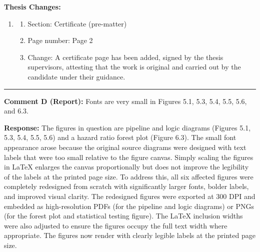 \documentclass[12pt,a4paper]{article}
\begin{document}
\begin{flushleft}
\textbf{Thesis Changes:}
\begin{enumerate}
    \item
    \begin{enumerate}
        \item Section: Certificate (pre-matter)
        \item Page number: Page 2
        \item Change: A certificate page has been added, signed by the thesis supervisors, attesting that the work is original and carried out by the candidate under their guidance.
    \end{enumerate}
\end{enumerate}

\vspace{\baselineskip}

\hrule

\vspace{\baselineskip}

\textbf{Comment D (Report):} Fonts are very small in Figures 5.1, 5.3, 5.4, 5.5, 5.6, and 6.3.

\vspace{\baselineskip}

\textbf{Response:} The figures in question are pipeline and logic diagrams (Figures 5.1, 5.3, 5.4, 5.5, 5.6) and a hazard ratio forest plot (Figure 6.3). The small font appearance arose because the original source diagrams were designed with text labels that were too small relative to the figure canvas. Simply scaling the figures in LaTeX enlarges the canvas proportionally but does not improve the legibility of the labels at the printed page size. To address this, all six affected figures were completely redesigned from scratch with significantly larger fonts, bolder labels, and improved visual clarity. The redesigned figures were exported at 300 DPI and embedded as high-resolution PDFs (for the pipeline and logic diagrams) or PNGs (for the forest plot and statistical testing figure). The LaTeX inclusion widths were also adjusted to ensure the figures occupy the full text width where appropriate. The figures now render with clearly legible labels at the printed page size.

\vspace{\baselineskip}


\end{flushleft}
\end{document}
